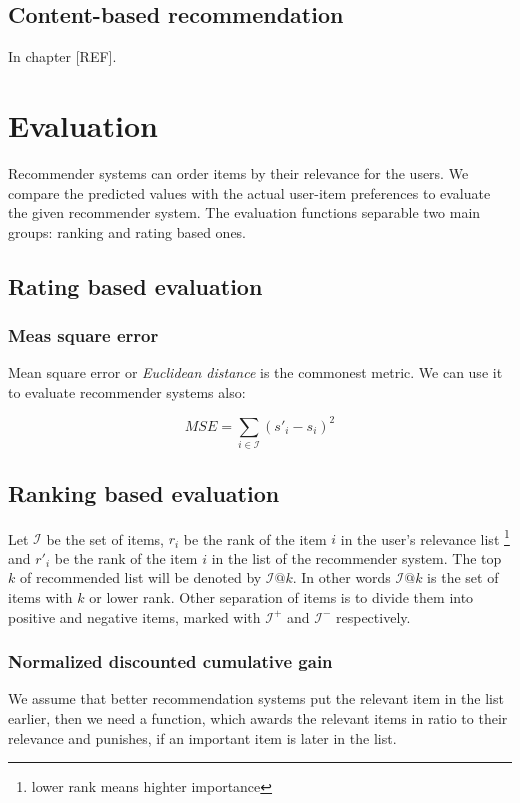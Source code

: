 \subsection{Content-based recommendation}
In chapter [REF].

\section{Evaluation}
Recommender systems can order items by their relevance for the users. We compare the
predicted values with the actual user-item preferences to evaluate the given recommender
system. The evaluation functions separable two main groups: ranking and rating based ones.

\subsection{Rating based evaluation }

\subsubsection{Meas square error}
Mean square error or \emph{Euclidean distance} is the commonest metric. We can use it to
evaluate recommender systems also:

\[MSE=\sum_{i\in\mathcal{I}}(s'_i - s_i)^2\]

\subsection{Ranking based evaluation}
Let $\mathcal{I}$ be the set of items, $r_i$ be the rank of the item $i$ in the
user's relevance list \footnote{lower rank means highter importance}  and
$r'_i$ be the rank of the item $i$ in the list of the recommender system.
The top $k$ of recommended list will be denoted by $\mathcal{I}@k$. In other words
$\mathcal{I}@k$ is the set of items with $k$ or lower rank. Other separation of
items is to divide them into positive and negative items, marked with  $\mathcal{I}^+$ and
$\mathcal{I}^-$ respectively.

\subsubsection{Normalized discounted cumulative gain}
We assume that better recommendation systems put the relevant item
in the list earlier, then we need a function, which awards the relevant items
in ratio to their relevance and punishes, if an important item is later in the
list. 

